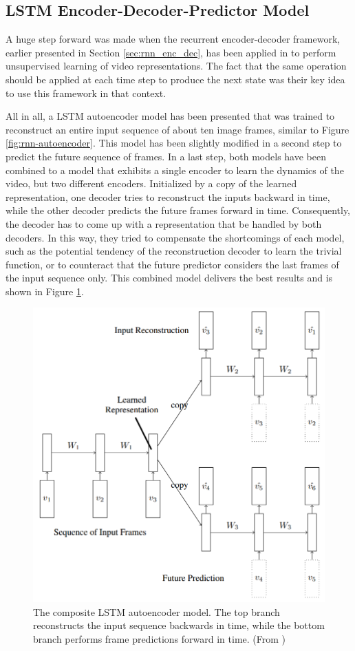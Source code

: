 \subsection{LSTM Encoder-Decoder-Predictor Model}

A huge step forward was made when the recurrent encoder-decoder framework, earlier presented in Section \ref{sec:rnn_enc_dec}, has been applied in \parencite{unsup_learn_lstm} to perform unsupervised learning of video representations. The fact that the same operation should be applied at each time step to produce the next state was their key idea to use this framework in that context. 

All in all, a LSTM autoencoder model has been presented that was trained to reconstruct an entire input sequence of about ten image frames, similar to Figure \ref{fig:rnn-autoencoder}. This model has been slightly modified in a second step to predict the future sequence of frames. In a last step, both models have been combined to a model that exhibits a single encoder to learn the dynamics of the video, but two different encoders. Initialized by a copy of the learned representation, one decoder tries to reconstruct the inputs backward in time, while the other decoder predicts the future frames forward in time. Consequently, the decoder has to come up with a representation that be handled by both decoders. In this way, they tried to compensate the shortcomings of each model, such as the potential tendency of the reconstruction decoder to learn the trivial function, or to counteract that the future predictor considers the last frames of the input sequence only. This combined model delivers the best results and is shown in Figure \ref{fig:lstm_combo}.

\begin{figure}[htb]
	\centering
	\includegraphics[width=0.5\linewidth]{figures/related/combo_shrinked.png} 
	\caption[Composite LSTM Autoencoder Model]{The composite LSTM autoencoder model. The top branch reconstructs the input sequence backwards in time, while the bottom branch performs frame predictions forward in time. (From \parencite{unsup_learn_lstm})} \label{fig:lstm_combo}
\end{figure}

